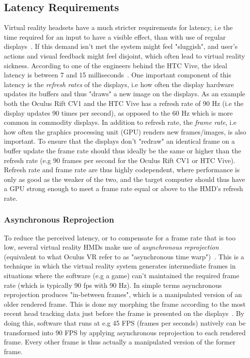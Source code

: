 \subsection{Latency Requirements}
Virtual reality headsets have a much stricter requirements for latency, i.e the time required for an input to have a visible effect, 
than with use of regular displays~\citep{ROADTOVR2013}. If this demand isn't met the system might feel "sluggish", and user's actions and 
visual feedback might feel disjoint, which often lead to virtual reality sickness. According to one of the engineers behind the HTC Vive, the ideal
latency is between 7 and 15 milliseconds~\citep{ARSTECHNICA2013}. One important component of this latency is the \textit{refresh rates} of the displays, i.e 
how often the display hardware updates its buffers and thus "draws" a new image on the displays. As an example both the Oculus Rift CV1 and the HTC Vive
has a refresh rate of 90 Hz (i.e the display updates 90 times per second), as opposed to the 60 Hz which is more common in commodity displays.
In addition to refresh rate, the \textit{frame rate}, i.e how often the graphics processing unit (GPU) renders new frames/images, is also important. To ensure 
that the displays don't "redraw" an identical frame on a buffer update the frame rate should thus ideally be the same or higher than the refresh 
rate (e.g 90 frames per second for the Oculus Rift CV1 or HTC Vive). Refresh rate and frame rate are thus highly codependent, where performance is only as good as the weaker
of the two, and the target computer should thus have a GPU strong enough to meet a frame rate equal or above to the HMD's refresh rate. 

\subsubsection{Asynchronous Reprojection}
To reduce the perceived latency, or to compensate for a frame rate that is too low, several virtual reality HMDs make use of \textit{asynchronous reprojection}
(equivalent to what Oculus VR refer to as "asynchronous time warp")~\citep{GD2016}. This is a technique in which the virtual reality system generates intermediate frames 
in situations where the software (e.g a game) can't maintained the required frame rate (which is typically 90 fps with 90 Hz). In simple terms asynchronous reprojection 
produces "in-between frames", which is a manipulated version of an older rendered frame. This is done my morphing the frame according to the most recent head tracking data just 
before the frame is presented on the displays~\citep{GD2016}. By doing this, software that runs at e.g 45 FPS (frames per seconds) natively can be transformed into 90 FPS by 
applying asynchronous reprojection to each rendered frame. Every other frame is thus actually a manipulated version of the former frame. 

